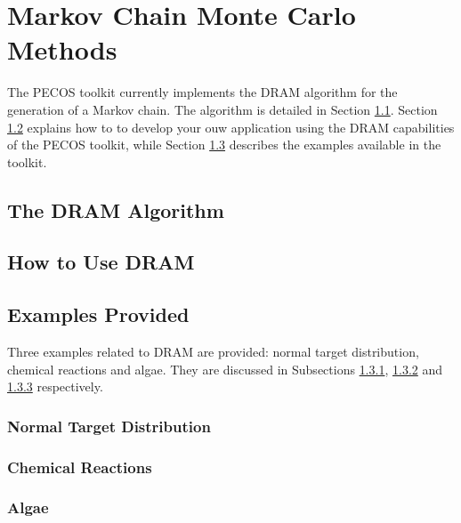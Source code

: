 \chapter{Markov Chain Monte Carlo Methods}\label{ch-mcmc}
\thispagestyle{headings}

The PECOS toolkit currently implements the DRAM algorithm \cite{HaLaMiSa06} for the generation of a Markov chain.
The algorithm is detailed in Section \ref{sc-dram-alg}.
Section \ref{sc-dram-how-to-use} explains how to to develop your ouw application using the DRAM capabilities of the PECOS toolkit, while
Section \ref{sc-dram-examples} describes the examples available in the toolkit.

\section{The DRAM Algorithm}\label{sc-dram-alg}

\section{How to Use DRAM}\label{sc-dram-how-to-use}

\section{Examples Provided}\label{sc-dram-examples}

Three examples related to DRAM are provided: normal target distribution, chemical reactions and algae.
They are discussed in Subsections \ref{subsc-dram-normal-ex}, \ref{subsc-dram-himmel-ex} and \ref{subsc-dram-algae-ex} respectively.

\subsection{Normal Target Distribution}\label{subsc-dram-normal-ex}

\subsection{Chemical Reactions}\label{subsc-dram-himmel-ex}

\subsection{Algae}\label{subsc-dram-algae-ex}

